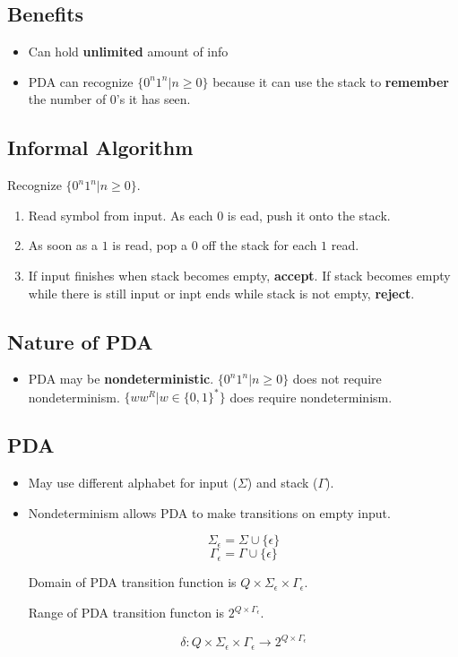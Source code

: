 \documentclass{article}
\begin{document}
\subsection*{Benefits}

\begin{itemize}
\item Can hold \textbf{unlimited} amount of info
\item PDA can recognize $\{0^n1^n|n\ge0\}$ because it can use the
  stack to \textbf{remember} the number of $0$'s it has seen.
\end{itemize}

\subsection*{Informal Algorithm}

Recognize $\{0^n1^n|n\ge0\}$.

\begin{enumerate}
\item Read symbol from input. As each $0$ is ead, push it onto the
  stack.
\item As soon as a $1$ is read, pop a $0$ off the stack for each $1$
  read.
\item If input finishes when stack becomes empty, \textbf{accept}. If
  stack becomes empty while there is still input or inpt ends while
  stack is not empty, \textbf{reject}.
\end{enumerate}

\subsection*{Nature of PDA}

\begin{itemize}
\item PDA may be \textbf{nondeterministic}. $\{0^n1^n|n\ge0\}$ does
  not require nondeterminism. $\{ww^R|w\in\{0,1\}^*\}$ does require
  nondeterminism.
\end{itemize}

\subsection*{PDA}

\begin{itemize}
\item May use different alphabet for input ($\Sigma$) and stack
  ($\Gamma$).
\item Nondeterminism allows PDA to make transitions on empty input.

  \[
  \Sigma_\epsilon = \Sigma\cup\{\epsilon\}
  \] \[
  \Gamma_\epsilon = \Gamma\cup\{\epsilon\}
  \]

  Domain of PDA transition function is
  $Q\times\Sigma_\epsilon\times\Gamma_\epsilon$.

  Range of PDA transition functon is $2^{Q\times\Gamma_\epsilon}$.

  \[
  \delta:Q\times\Sigma_\epsilon\times\Gamma_\epsilon\rightarrow2^{Q\times\Gamma_\epsilon}
  \]
\end{itemize}
\end{document}
